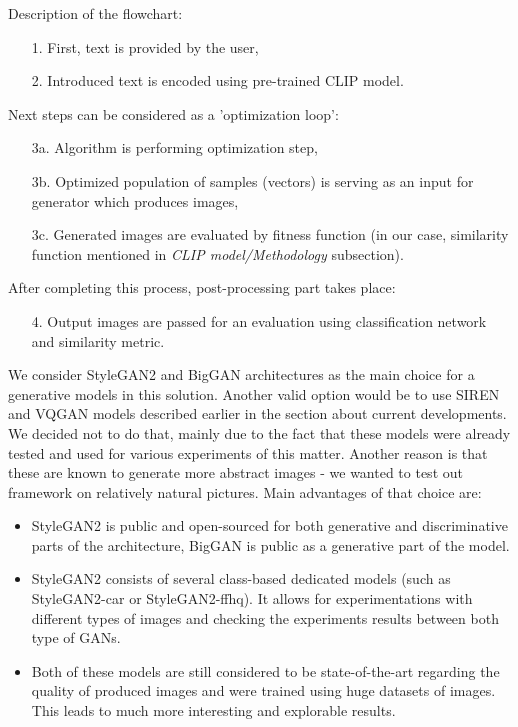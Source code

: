 \documentclass[12pt,a4paper,openany]{book}
\begin{document}
\noindent Description of the flowchart:
\begin{enumerate}
\item [1.] First, text is provided by the user,
\item [2.] Introduced text is encoded using pre-trained CLIP model.
\end{enumerate}
Next steps can be considered as a 'optimization loop':
\begin{enumerate}
\item [3a.] Algorithm is performing optimization step,
\item [3b.] Optimized population of samples (vectors)  is serving as an input for generator which produces images,
\item [3c.] Generated images are evaluated by fitness function (in our case, similarity function mentioned in \textit{CLIP model/Methodology} subsection).
\end{enumerate}
\noindent After completing this process, post-processing part takes place:
\begin{enumerate}
\item [4.] Output images are passed for an evaluation using classification network and similarity metric.
\end{enumerate}

We consider StyleGAN2 and BigGAN architectures as the main choice for a generative models in this solution. Another valid option would be to use SIREN and VQGAN models described earlier in the section about current developments. We decided not to do that, mainly due to the fact that these models were already tested and used for various experiments of this matter. Another reason is that these are known to generate more abstract images - we wanted to test out framework on relatively natural pictures.  Main advantages of that choice are:
\begin{itemize}
\item StyleGAN2 is public and open-sourced for both generative and discriminative parts of the architecture, BigGAN is public as a generative part of the model. 
\item StyleGAN2 consists of several class-based dedicated models (such as StyleGAN2-car or StyleGAN2-ffhq). It allows for experimentations with different types of images and checking the experiments results between both type of GANs.
\item Both of these models are still considered to be state-of-the-art regarding the quality of produced images and were trained using huge datasets of images. This leads to much more interesting and explorable results.
\end{itemize}
\end{document}
